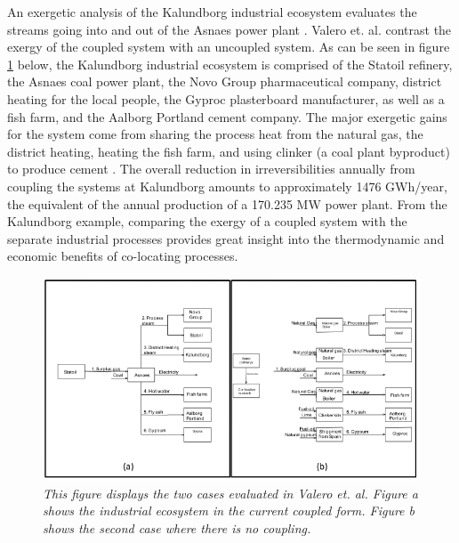 \documentclass[12pt]{UIdahoMastersThesis}
\begin{document}
 An exergetic analysis of the Kalundborg industrial ecosystem evaluates the streams going into and out of the Asnaes power plant \cite{Valero2012}.  Valero et. al. contrast the exergy of the coupled system with an uncoupled system. As can be seen in figure \ref{Kalendburg} below, the Kalundborg industrial ecosystem is comprised of the Statoil refinery, the Asnaes coal power plant, the Novo Group pharmaceutical company, district heating for the local people, the Gyproc plasterboard manufacturer, as well as a fish farm, and  the Aalborg Portland cement company. The major exergetic gains for the system come from sharing the process heat from the natural gas, the district heating, heating the fish farm, and using clinker (a coal plant byproduct) to produce cement \cite{Valero2012}. The overall reduction in irreversibilities annually from coupling the systems at Kalundborg amounts to approximately 1476 GWh/year, the equivalent of the annual production of a 170.235 MW power plant. From the Kalundborg example, comparing the exergy of a coupled system with the separate industrial processes provides great insight into the thermodynamic and economic benefits of co-locating processes.

\begin{figure}
\centering
\label{Kalendburg}
\includegraphics[width=.7\textwidth]{kalundborg_cases.PNG}
\caption{\small \sl This figure displays the two cases evaluated in Valero et. al. Figure a shows the industrial ecosystem in the current coupled form. Figure b shows the second case where there is no coupling.}
\end{figure}

 
\end{document}
